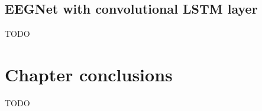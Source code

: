 
\subsection{EEGNet with convolutional LSTM layer}
\label{subsec:offline_bci_system_adding_memory_convlstm_eegnet}


TODO

\section{Chapter conclusions}
\label{sec:offline_bci_summary}

TODO